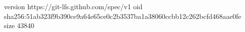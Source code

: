 version https://git-lfs.github.com/spec/v1
oid sha256:51ab323f9b390ce9a64e65ce0c2b3537ba1a38060ccbb12c262bcfd468aae0fe
size 43840
